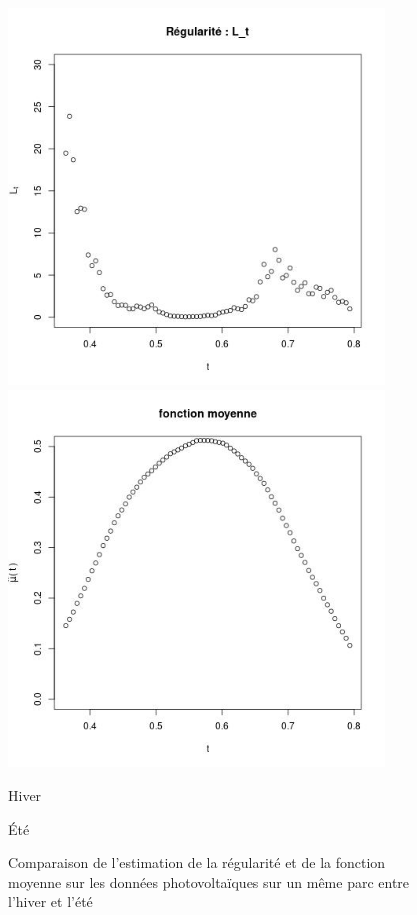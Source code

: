 \begin{figure}[H]
\begin{minipage}{0.48\textwidth}
		\includegraphics[width=0.89\textwidth]{Images/pv_estim/ete_187128_Lt.jpg}
		\includegraphics[width=0.89\textwidth]{Images/pv_estim/ete_187128_mut.jpg}
	\end{minipage}
	\begin{minipage}{0.48\textwidth}
		\centering
		Hiver
	\end{minipage}
	\begin{minipage}{0.48\textwidth}
		\centering
		Été
	\end{minipage}
	\caption{Comparaison de l'estimation de la régularité et de la fonction moyenne sur les données photovoltaïques sur un même parc entre l'hiver et l'été}
	\label{fig:estim_reg_mu_hiv_ete}
\end{figure}


